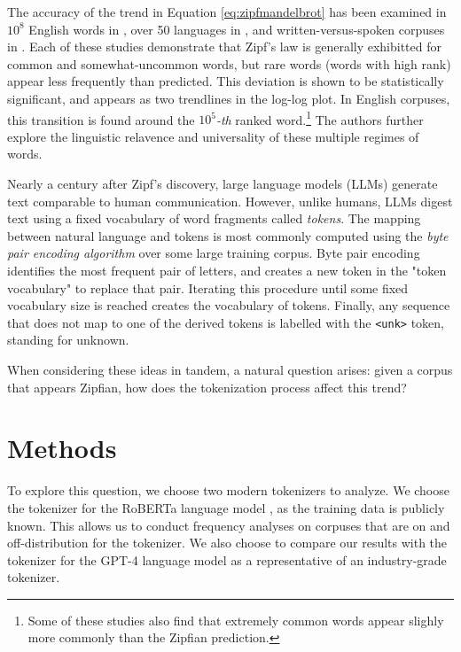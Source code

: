 \documentclass[11pt]{article}
\begin{document}
The accuracy of the trend in Equation \ref{eq:zipfmandelbrot} has been examined in $10^8$ English words in \cite{cancho2000}, over 50 languages in \cite{yu2018zipfslaw50languages}, and written-versus-spoken corpuses in \cite{lin2015scalinglawshumanspeech}. Each of these studies demonstrate that Zipf's law is generally exhibitted for common and somewhat-uncommon words, but rare words (words with high rank) appear less frequently than predicted. This deviation is shown to be statistically significant, and appears as two trendlines in the log-log plot. In English corpuses, this transition is found around the $10^5$\textit{-th} ranked word.\footnote{Some of these studies also find that extremely common words appear slighly more commonly than the Zipfian prediction.} The authors further explore the linguistic relavence and universality of these multiple regimes of words. 

Nearly a century after Zipf's discovery, large language models (LLMs) generate text comparable to human communication. However, unlike humans, LLMs digest text using a fixed vocabulary of word fragments called \textit{tokens}. The mapping between natural language and tokens is most commonly computed using the \textit{byte pair encoding algorithm} \cite{bpegage} over some large training corpus. Byte pair encoding identifies the most frequent pair of letters, and creates a new token in the "token vocabulary" to replace that pair. Iterating this procedure until some fixed vocabulary size is reached creates the vocabulary of tokens. Finally, any sequence that does not map to one of the derived tokens is labelled with the \texttt{<unk>} token, standing for unknown.

When considering these ideas in tandem, a natural question arises: given a corpus that appears Zipfian, how does the tokenization process affect this trend?

\section{Methods}

To explore this question, we choose two modern tokenizers to analyze. We choose the tokenizer for the RoBERTa language model \cite{liu2019robertarobustlyoptimizedbert}, as the training data is publicly known. This allows us to conduct frequency analyses on corpuses that are on and off-distribution for the tokenizer. We also choose to compare our results with the tokenizer for the GPT-4 language model \cite{openai2024gpt4technicalreport} as a representative of an industry-grade tokenizer. 
\end{document}
